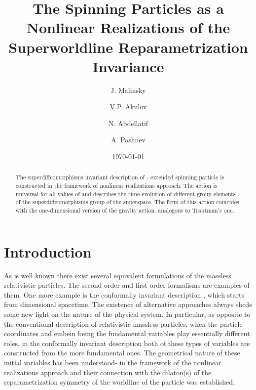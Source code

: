 \documentclass[a4paper,twocolumn,showpacs,preprintnumbers,amsmath,amssymb]{revtex4}
\begin{document}
\title{The Spinning Particles as a Nonlinear Realizations of the
Superworldline Reparametrization Invariance}%

\author{J. Malinsky}%
 \author{V.P. Akulov}%
\author{N. Abdellatif}
%

\author{A. Pashnev}
%

\date{\today}

\begin{abstract}
The superdiffeomorphisms invariant description
of \coordHE{} - extended spinning particle is constructed in the framework of
nonlinear realizations approach. The action is universal
for all values of \coordHE{} and describes the time evolution of \coordHE{} different
group elements of the superdiffeomorphisms group of the \coordHE{} superspace.
The form of this action
coincides  with the one-dimensional
version of the gravity action,  analogous to Trautman's one.
\end{abstract}


\maketitle

\section{Introduction}
As is well known there exist several equivalent formulations of the
massless relativistic particles. The second order and first order
formalisms are examples of them.
One more example is the
conformally invariant description \cite{M}, which starts from
\coordHE{} dimensional spacetime.
The existence of alternative approaches always sheds some new light
on the nature of the physical system. In particular,
as opposite to the conventional description of relativistic massless
particles, when the particle coordinates and einbein being the fundamental
variables play
essentially different roles, in the conformally invariant description
both of these types of variables are constructed from the more
fundamental
ones\cite{M,S}. The geometrical nature of these
initial variables
has been understood\cite{P1}-\cite{P2} in the framework of
the nonlinear realizations approach and their connection  with the
dilaton(s) of the reparametrization symmetry of the worldline of the particle
was established.
\end{document}
